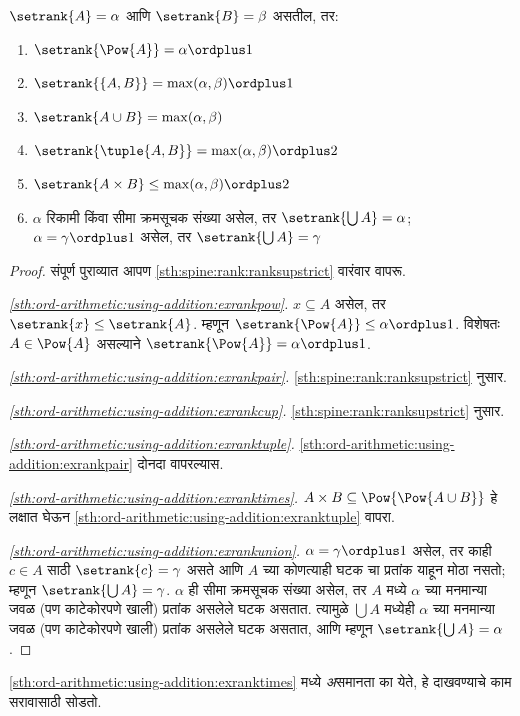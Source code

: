\begin{lem}\label{sth:ord-arithmetic:using-addition:rankcomputation}
$\setrank{A} = \alpha$ आणि $\setrank{B} = \beta$ असतील, तर:
\begin{enumerate}
  \item\label{sth:ord-arithmetic:using-addition:exrankpow} $\setrank{\Pow{A}} = \alpha\ordplus 1$
  \item\label{sth:ord-arithmetic:using-addition:exrankpair} $\setrank{\{A, B\}} = \max(\alpha,
  \beta) \ordplus 1$
  \item\label{sth:ord-arithmetic:using-addition:exrankcup} $\setrank{A \cup B} = \max(\alpha,
  \beta)$
  \item\label{sth:ord-arithmetic:using-addition:exranktuple} $\setrank{\tuple{A,B}} = \max(\alpha,
  \beta) \ordplus  2$
  \item\label{sth:ord-arithmetic:using-addition:exranktimes} $\setrank{A \times B} \leq \max(\alpha,
  \beta) \ordplus  2$
  \item\label{sth:ord-arithmetic:using-addition:exrankunion} $\alpha$ रिकामी किंवा सीमा क्रमसूचक संख्या असेल, तर $\setrank{\bigcup A} = \alpha$; $\alpha = \gamma\ordplus 1$ असेल, तर $\setrank{\bigcup A} = \gamma$
\end{enumerate}
\end{lem}

\begin{proof}
संपूर्ण पुराव्यात आपण \ref{sth:spine:rank:ranksupstrict} वारंवार वापरू.

\emph{\ref{sth:ord-arithmetic:using-addition:exrankpow}.} $x \subseteq A$ असेल, तर $\setrank{x} \leq
\setrank{A}$. म्हणून $\setrank{\Pow{A}} \leq \alpha \ordplus  1$. विशेषतः $A
\in \Pow{A}$ असल्याने $\setrank{\Pow{A}} = \alpha \ordplus  1$.

\emph{\ref{sth:ord-arithmetic:using-addition:exrankpair}.} \ref{sth:spine:rank:ranksupstrict} नुसार.

\emph{\ref{sth:ord-arithmetic:using-addition:exrankcup}.} \ref{sth:spine:rank:ranksupstrict} नुसार.

\emph{\ref{sth:ord-arithmetic:using-addition:exranktuple}.} \ref{sth:ord-arithmetic:using-addition:exrankpair} दोनदा वापरल्यास.

\emph{\ref{sth:ord-arithmetic:using-addition:exranktimes}.} $A \times B \subseteq
\Pow{\Pow{A \cup B}}$ हे लक्षात घेऊन \ref{sth:ord-arithmetic:using-addition:exranktuple} वापरा.

\emph{\ref{sth:ord-arithmetic:using-addition:exrankunion}.} $\alpha = \gamma\ordplus 1$ असेल, तर काही $c \in A$ साठी $\setrank{c} = \gamma$ असते आणि $A$ च्या कोणत्याही घटक चा प्रतांक याहून मोठा नसतो; म्हणून $\setrank{\bigcup A} = \gamma$. $\alpha$ ही सीमा क्रमसूचक संख्या असेल, तर $A$ मध्ये $\alpha$ च्या मनमान्या जवळ (पण काटेकोरपणे खाली) प्रतांक असलेले घटक असतात. त्यामुळे $\bigcup A$ मध्येही $\alpha$ च्या मनमान्या जवळ (पण काटेकोरपणे खाली) प्रतांक असलेले घटक असतात, आणि म्हणून $\setrank{\bigcup A} = \alpha$.
\end{proof}
\noindent
\ref{sth:ord-arithmetic:using-addition:exranktimes} मध्ये \emph{अ}समानता का येते, हे दाखवण्याचे काम सरावासाठी सोडतो.

